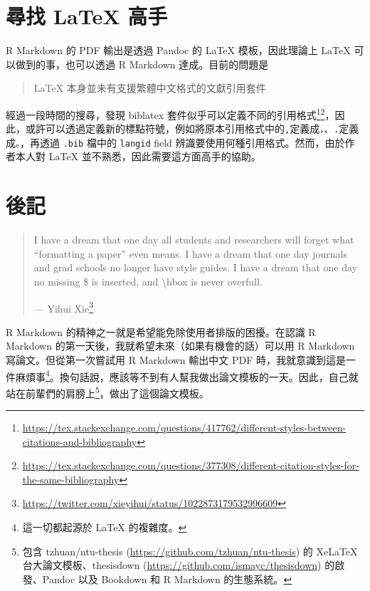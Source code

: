 \documentclass[oneside]{book}
\renewcommand{\href}[2]{#2\footnote{\url{#1}}}
\theoremstyle{definition}
\theoremstyle{definition}
\theoremstyle{definition}
\theoremstyle{remark}
\begin{document}
\chapter{尋找 LaTeX 高手}\label{latex-cite-pkg}

R Markdown 的 PDF 輸出是透過 Pandoc 的 LaTeX 模板，因此理論上 LaTeX
可以做到的事，也可以透過 R Markdown 達成。目前的問題是

\begin{quote}
LaTeX 本身並未有支援繁體中文格式的文獻引用套件
\end{quote}

經過一段時間的搜尋，發現 biblatex
套件似乎可以定義不同的引用格式\footnote{\url{https://tex.stackexchange.com/questions/417762/different-styles-between-citations-and-bibliography}}\footnote{\url{https://tex.stackexchange.com/questions/377308/different-citation-styles-for-the-same-bibliography}}，因此，或許可以透過定義新的標點符號，例如將原本引用格式中的\texttt{,}定義成\texttt{，}、\texttt{.}定義成\texttt{。}，再透過
\texttt{.bib} 檔中的 \texttt{langid} field
辨識要使用何種引用格式。然而，由於作者本人對 LaTeX
並不熟悉，因此需要這方面高手的協助。

\chapter{後記}\label{epilogue}

\begin{quote}
I have a dream that one day all students and researchers will forget
what ``formatting a paper'' even means. I have a dream that one day
journals and grad schools no longer have style guides. I have a dream
that one day no missing \$ is inserted, and \textbackslash{}hbox is
never overfull.

\hspace*{\fill} ---
\href{https://twitter.com/xieyihui/status/1022873179532996609}{Yihui
Xie}
\end{quote}

R Markdown 的精神之一就是希望能免除使用者排版的困擾。在認識 R Markdown
的第一天後，我就希望未來（如果有機會的話）可以用 R Markdown
寫論文。但從第一次嘗試用 R Markdown 輸出中文 PDF
時，我就意識到這是一件麻煩事\footnote{這一切都起源於 LaTeX 的複雜度。}。換句話說，應該等不到有人幫我做出論文模板的一天。因此，自己就站在前輩們的肩膀上\footnote{包含
  tzhuan/ntu-thesis (\url{https://github.com/tzhuan/ntu-thesis}) 的
  XeLaTeX 台大論文模板、thesisdown
  (\url{https://github.com/ismayc/thesisdown}) 的啟發、Pandoc 以及
  Bookdown 和 R Markdown 的生態系統。}，做出了這個論文模板。
\end{document}
